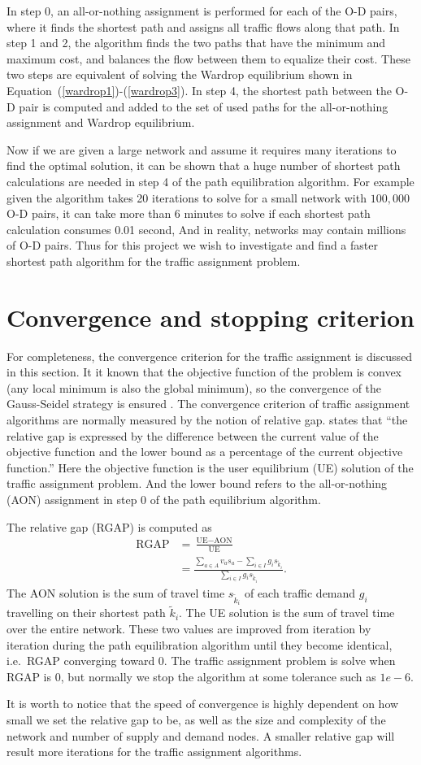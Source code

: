 In step 0, an all-or-nothing assignment is performed for each of the O-D pairs,
where it finds the shortest path and assigns all traffic flows along that path.
In step 1 and 2, the algorithm finds the two paths that have the minimum and maximum cost, and balances the flow between them to equalize their cost.
These two steps are equivalent of solving the Wardrop equilibrium shown in Equation~(\ref{wardrop1})-(\ref{wardrop3}).
In step 4, the shortest path between the O-D pair is computed and added to the set of used paths for the all-or-nothing assignment and Wardrop equilibrium.

Now if we are given a large network and assume it requires many iterations to find the optimal solution,
it can be shown that a huge number of shortest path calculations are needed in step 4 of the path equilibration algorithm.
For example given the algorithm takes 20 iterations to solve for a small network with $100,000$ O-D pairs,
it can take more than 6 minutes to solve if
each shortest path calculation consumes 0.01 second,
And in reality,
networks may contain millions of O-D pairs.
Thus for this project we wish to
investigate and find a faster shortest path algorithm for the traffic assignment problem.

\section{Convergence and stopping criterion} \label{sec:convergence}

For completeness, the convergence criterion for the traffic assignment is discussed in this section.
It it known that the objective function of the problem is convex (any local minimum is also the global minimum),
so the convergence of the Gauss-Seidel strategy is ensured \citep{Florian2008}.
The convergence criterion of traffic assignment algorithms are normally measured by the notion of relative gap.
\cite{Rose} states that ``the relative gap is expressed by the difference between the current value of 
the objective function and the lower bound as a percentage of the current objective function.''
Here the objective function is the user equilibrium (UE) solution of the traffic assignment problem.
And the lower bound refers to the all-or-nothing (AON) assignment in step 0 of the path equilibrium algorithm.

The relative gap (RGAP) is computed as
\begin{align}
    \text{RGAP} &= \frac{\text{UE} - \text{AON}}{\text{UE}} \\
                &= \frac{\sum_{a \in A} v_a s_a - \sum_{i \in I} g_i s_{\tilde{k}_i}}{\sum_{i \in I} g_i s_{\tilde{k}_i}}.
\end{align}
The AON solution is the sum of travel time $s_{\tilde{k}_i}$ of each traffic demand $g_i$ travelling on their shortest path $\tilde{k}_i$.
The UE solution is the sum of travel time over the entire network.
These two values are improved from iteration by iteration during the path equilibration algorithm until they become identical, i.e.\ RGAP converging toward 0.
The traffic assignment problem is solve when RGAP is 0,
but normally we stop the algorithm at some tolerance such as $1e-6$.

It is worth to notice that the speed of convergence is highly dependent on how small we set the relative gap to be,
as well as the size and complexity of the network and number of supply and demand nodes.
A smaller relative gap will result more iterations for the traffic assignment algorithms.

